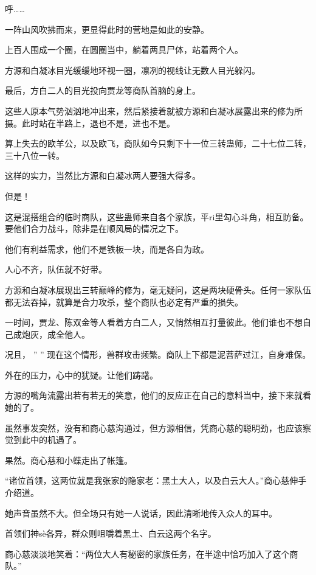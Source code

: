 
\begin{this_body}

呼……

一阵山风吹拂而来，更显得此时的营地是如此的安静。

上百人围成一个圈，在圆圈当中，躺着两具尸体，站着两个人。

方源和白凝冰目光缓缓地环视一圈，凛冽的视线让无数人目光躲闪。

最后，方白二人的目光投向贾龙等商队首脑的身上。

这些人原本气势汹汹地冲出来，然后紧接着就被方源和白凝冰展露出来的修为所摄。此时站在半路上，退也不是，进也不是。

算上失去的欧羊公，以及欧飞，商队如今只剩下十一位三转蛊师，二十七位二转，三十八位一转。

这样的实力，当然比方源和白凝冰两人要强大得多。

但是！

这是混搭组合的临时商队，这些蛊师来自各个家族，平ri里勾心斗角，相互防备。要他们合力战斗，除非是在顺风局的情况之下。

他们有利益需求，他们不是铁板一块，而是各自为政。

人心不齐，队伍就不好带。

方源和白凝冰展现出三转巅峰的修为，毫无疑问，这是两块硬骨头。任何一家队伍都无法吞掉，就算是合力攻杀，整个商队也必定有严重的损失。

一时间，贾龙、陈双金等人看着方白二人，又悄然相互打量彼此。他们谁也不想自己成炮灰，成全他人。

况且， ” ” 现在这个情形，兽群攻击频繁。商队上下都是泥菩萨过江，自身难保。

外在的压力，心中的犹疑。让他们踌躇。

方源的嘴角流露出若有若无的笑意，他们的反应正在自己的意料当中，接下来就看她的了。

虽然事发突然，没有和商心慈沟通过，但方源相信，凭商心慈的聪明劲，也应该察觉到此中的机遇了。

果然。商心慈和小蝶走出了帐篷。

“诸位首领，这两位就是我张家的隐家老：黑土大人，以及白云大人。”商心慈伸手介绍道。

她声音虽然不大。但全场只有她一人说话，因此清晰地传入众人的耳中。

首领们神sè各异，群众则咀嚼着黑土、白云这两个名字。

商心慈淡淡地笑着：“两位大人有秘密的家族任务，在半途中恰巧加入了这个商队。”


\end{this_body}
